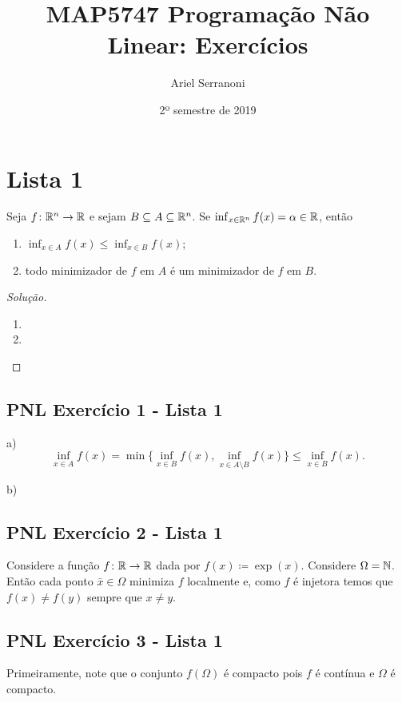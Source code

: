 \documentclass[12pt,twoside,a4paper]{book}
\title{MAP5747 Programação Não Linear: Exercícios}
\author{Ariel Serranoni}
\date{2º semestre de 2019}
\begin{document}
\maketitle

\chapter*{Lista 1}
\begin{problema}
Seja \(f\colon\mathbb{R}^n\to\mathbb{R}\) e sejam \(B\subseteq A\subseteq\mathbb{R}^n\). Se
\(\inf_{x\in\mathbb{R}^n}f(x)=\alpha\in\mathbb{R}\), então
\begin{enumerate}[label=(\roman*)]
\item \(\inf_{x\in A}f(x)\leq\inf_{x\in B}f(x)\);
\item todo minimizador de \(f\) em \(A\) é um minimizador de \(f\) em \(B\).
\end{enumerate}
\end{problema}
\begin{proof}[Solução]\hfill
  \begin{enumerate}[label=(\roman*)]
  \item
  \item
    \end{enumerate}
\end{proof}

\section{PNL Exercício 1 - Lista 1}
\label{sec:org41d184a}

a) \[\inf_{x\in A} f(x)=\min\{\inf_{x\in B}f(x), \inf_{x\in A\setminus B}f(x)\}\leq\inf_{x\in B}f(x).\]

b)

\section{PNL Exercício 2 - Lista 1}
\label{sec:org8affeec}

Considere a função \(f\colon\mathbb{R}\to\mathbb{R}\) dada por \(f(x)\coloneqq\exp(x)\). Considere \(\Omega=\mathbb{N}\).
Então cada ponto \(\bar{x}\in\Omega\) minimiza \(f\) localmente e, como \(f\) é injetora temos que \(f(x)\not=f(y)\)
sempre que \(x\not= y\).

\section{PNL Exercício 3 - Lista 1}
\label{sec:orga567c7d}
Primeiramente, note que o conjunto \(f(\Omega)\) é compacto pois \(f\) é contínua e \(\Omega\) é compacto.
\end{document}
